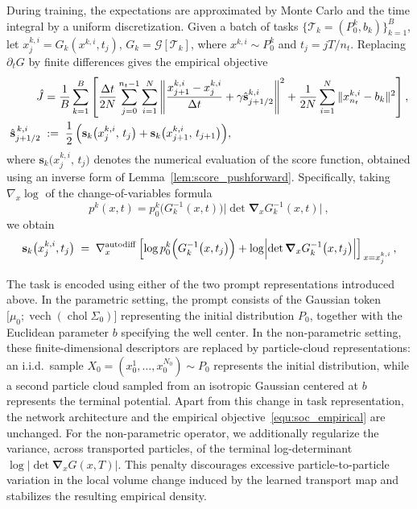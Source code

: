 \documentclass[preprint]{elsarticle}
\newcommand{\qb}[1]{\bigl(#1\bigr)}          %
\newcommand{\qB}[1]{\Bigl(#1\Bigr)}          %
\newcommand{\sT}{\mathcal{T}}
\newcommand{\sG}{\mathcal{G}}
\newcommand{\inv}{^{-1}}
\begin{document}
During training, the expectations are approximated by Monte Carlo and the time integral by a uniform discretization. Given a batch of tasks $\{\sT_k=(P_0^k,b_k)\}_{k=1}^B$, let $x_j^{k,i}=G_k(x^{k,i},t_j)$, $G_k=\sG[\sT_k]$, where $x^{k,i}\sim P_0^k$ and $t_j=jT/n_t$. Replacing $\partial_tG$ by finite differences gives the empirical objective
\begin{align}
\hat J
&=
\frac1B
\sum_{k=1}^{B}
\left[
\frac{\Delta t}{2N}
\sum_{j=0}^{n_t-1}
\sum_{i=1}^{N}
\left\|
\frac{x^{k,i}_{j+1}-x^{k,i}_{j}}{\Delta t}
+\gamma\hat{\mathbf{s}}_{j+1/2}^{k,i}
\right\|^2
+
\frac1{2N}
\sum_{i=1}^{N}
\|x_{n_t}^{k,i}-b_k\|^2
\right],
\label{equ:soc_empirical}\\
\hat{\mathbf{s}}^{\,k,i}_{j+1/2}
    \;&:=\;
    \frac12\,\qB{\mathbf{s}_k\qb{x^{k,i}_{j},\,t_j}+\mathbf{s}_k\qb{x^{k,i}_{j+1},\,t_{j+1}}},
    \notag
\end{align}
where $\mathbf{s}_k\qb{x^{k,i}_{j},\,t_j}$ denotes the numerical evaluation of the score function, obtained using an inverse form of Lemma~\ref{lem:score_pushforward}. Specifically, taking $\nabla_x\log$ of the change-of-variables formula 
\[
    p^k(x,t)=p^k_0\qb{G_k\inv(x,t)}\bigl|\det\boldsymbol{\nabla}_xG_k\inv(x,t)\bigr|
    \ ,
\]
we obtain
\begin{align}
\mathbf{s}_k\qb{x^{k,i}_j,t_j} \;=\; \nabla_x^{\mathrm{autodiff}} \left[ \log p^k_0\Bigl(G_k\inv\qb{x,t_j}\Bigr) + \log\Bigl| \det\boldsymbol{\nabla}_x G_k\inv\qb{x,t_j} \Bigr| \right]_{\,x=x^{k,i}_j}, \label{equ:score_discrete}
\end{align}

The task is encoded using either of the two prompt representations introduced above. In the parametric setting, the prompt consists of the Gaussian token $\bigl[\mu_0;\operatorname{vech}(\operatorname{chol}\Sigma_0)\bigr]$ representing the initial distribution $P_0$, together with the Euclidean parameter $b$ specifying the well center. In the non-parametric setting, these finite-dimensional descriptors are replaced by particle-cloud representations: an i.i.d.\ sample $X_0=(x_0^1,\ldots,x_0^{N_0})\sim P_0$ represents the initial distribution, while a second particle cloud sampled from an isotropic Gaussian centered at $b$ represents the terminal potential. Apart from this change in task representation, the network architecture and the empirical objective~\eqref{equ:soc_empirical} are unchanged. For the non-parametric operator, we additionally regularize the variance, across transported particles, of the terminal log-determinant $\log\bigl|\det\boldsymbol{\nabla}_xG(x,T)\bigr|$. This penalty discourages excessive particle-to-particle variation in the local volume change induced by the learned transport map and stabilizes the resulting empirical density.
\end{document}
